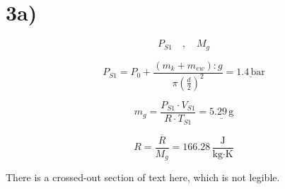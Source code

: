 

\section*{3a)}

\[
P_{S1} \quad , \quad M_{g}
\]

\[
P_{S1} = P_{0} + \frac{(m_{k} + m_{ew}): g}{\pi \left( \frac{d}{2} \right)^{2}} = \underline{1.4 \, \text{bar}}
\]

\[
m_{g} = \frac{P_{S1} \cdot V_{S1}}{R \cdot T_{S1}} = \underline{5.29 \, \text{g}}
\]

\[
R = \frac{\overline{R}}{M_{g}} = 166.28 \, \frac{\text{J}}{\text{kg} \cdot \text{K}}
\]

\noindent
There is a crossed-out section of text here, which is not legible.